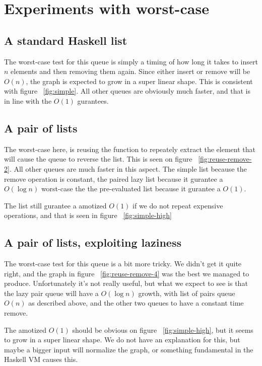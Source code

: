 \section*{Experiments with worst-case}

\subsection*{A standard Haskell list}
The worst-case test for this queue is simply a timing of how long it takes to insert $n$ elements and then removing them again. Since either insert or remove will be $O(n)$, the graph is expected to grow in a super linear shape. This is consistent with figure ~\ref{fig:simple}. All other queues are obviously much faster, and that is in line with the $O(1)$ gurantees.

\subsection*{A pair of lists}
The worst-case here, is reusing the function to repeately extract the element that will cause the queue to reverse the list. This is seen on figure ~\ref{fig:reuse-remove-2}. All other queues are much faster in this aspect. The simple list because the remove operation is constant, the paired lazy list because it gurantee a $O(\log n)$ worst-case the the pre-evaluated list because it gurantee a $O(1)$.

The list still gurantee a amotized $O(1)$ if we do not repeat expensive operations, and that is seen in figure ~\ref{fig:simple-high}

\subsection*{A pair of lists, exploiting laziness}
The worst-case test for this queue is a bit more tricky. We didn't get it quite right, and the graph in figure ~\ref{fig:reuse-remove-4} was the best we managed to produce. Unfortunately it's not really useful, but what we expect to see is that the lazy pair queue will have a $O(\log n)$ growth, with list of pairs queue $O(n)$ as described above, and the other two queues to have a constant time remove.

The amotized $O(1)$ should be obvious on figure ~\ref{fig:simple-high}, but it seems to grow in a super linear shape. We do not have an explanation for this, but maybe a bigger input will normalize the graph, or something fundamental in the Haskell VM causes this.

